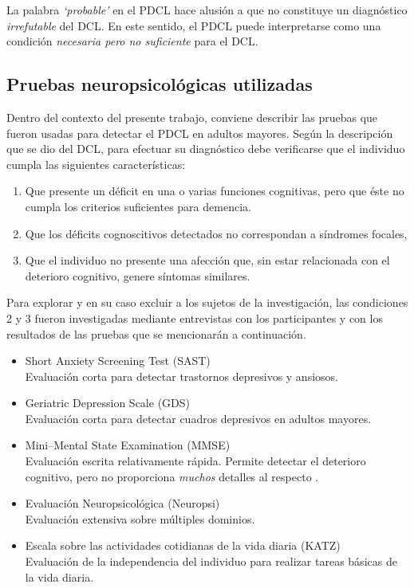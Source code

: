 \documentclass[12pt,letterpaper]{book}
\begin{document}
La palabra \textit{`probable'} en el PDCL hace alusión a que no constituye un diagnóstico \textit{irrefutable} del DCL.
%
En este sentido, el PDCL puede interpretarse como una condición \textit{necesaria pero no suficiente} para el DCL.


\subsection{Pruebas neuropsicológicas utilizadas}
\label{seccion:pruebas}

Dentro del contexto del presente trabajo, conviene describir las pruebas que fueron usadas para detectar el PDCL en adultos mayores.
%
Según la descripción que se dio del DCL, para efectuar su diagnóstico debe verificarse que el individuo cumpla las siguientes características:
\begin{enumerate}
\item Que presente un déficit en una o varias funciones cognitivas, pero que éste no cumpla los criterios suficientes para demencia.
\item Que los déficits cognoscitivos detectados no correspondan a síndromes focales,
\item Que el individuo no presente una afección que, sin estar relacionada con el deterioro cognitivo, genere síntomas similares.
\end{enumerate}
%
Para explorar y en su caso excluir a los sujetos de la investigación, las condiciones 2 y 3 fueron investigadas mediante entrevistas con los participantes y con los resultados de las pruebas que se mencionarán a continuación.
%
\begin{itemize}
\item {Short Anxiety Screening Test (SAST)}\\ 
Evaluación corta para detectar trastornos depresivos y ansiosos. \cite{sinoff99}

\item {Geriatric Depression Scale (GDS)}\\
Evaluación corta para detectar cuadros depresivos en adultos mayores. \cite{Yesavage82}

\item {Mini--Mental State Examination (MMSE)}\\
Evaluación escrita relativamente rápida. Permite detectar el deterioro cognitivo, pero no proporciona \textit{muchos} detalles al respecto \cite{folstein75}.

\item {Evaluación Neuropsicológica (Neuropsi)}\\
Evaluación extensiva sobre múltiples dominios. \cite{Solis03}

\item {Escala sobre las actividades cotidianas de la vida diaria (KATZ)}\\
Evaluación de la independencia del individuo para realizar tareas básicas de la vida diaria.   \cite{katz70} %
\end{itemize}
\end{document}
